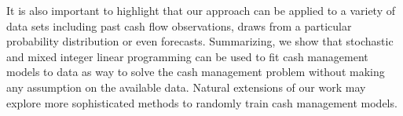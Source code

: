 It is also important to highlight that our approach can be applied to a variety of data sets including past cash flow observations, draws from a particular probability distribution or even forecasts. Summarizing, we show that stochastic and mixed integer linear programming can be used to fit cash management models to data as way to solve the cash management problem without making any assumption on the available data. Natural extensions of our work may explore more sophisticated methods to randomly train cash management models.



